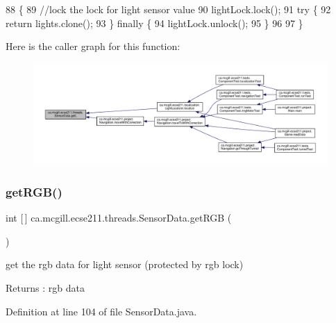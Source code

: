 \begin{DoxyCode}
88                          \{    
89     \textcolor{comment}{//lock the lock for light sensor value}
90     lightLock.lock();
91     \textcolor{keywordflow}{try} \{
92       \textcolor{keywordflow}{return} lights.clone();
93     \} \textcolor{keywordflow}{finally} \{
94       lightLock.unlock();
95     \}
96     
97   \}
\end{DoxyCode}
Here is the caller graph for this function\+:
\nopagebreak
\begin{figure}[H]
\begin{center}
\leavevmode
\includegraphics[width=350pt]{classca_1_1mcgill_1_1ecse211_1_1threads_1_1_sensor_data_a39eec50582f0e4bcff8a4669c48e1609_icgraph}
\end{center}
\end{figure}
\mbox{\label{classca_1_1mcgill_1_1ecse211_1_1threads_1_1_sensor_data_a76313564e284f5cdb66aefce4e595f3b}} 
\subsubsection{\texorpdfstring{get\+R\+G\+B()}{getRGB()}}
{\footnotesize\ttfamily int \mbox{[}$\,$\mbox{]} ca.\+mcgill.\+ecse211.\+threads.\+Sensor\+Data.\+get\+R\+GB (\begin{DoxyParamCaption}{ }\end{DoxyParamCaption})}

get the rgb data for light sensor (protected by rgb lock)

\begin{DoxyReturn}{Returns}
\+: rgb data 
\end{DoxyReturn}


Definition at line 104 of file Sensor\+Data.\+java.


